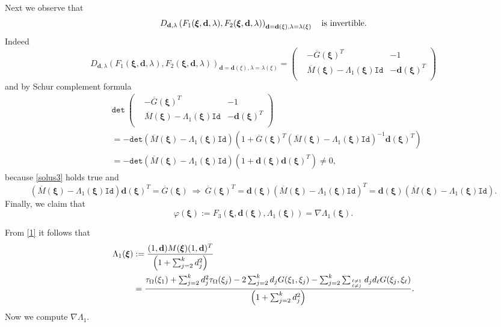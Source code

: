\documentclass[11pt,a4paper]{amsart}
\theoremstyle{definition}
\renewcommand{\(}{\left(}
\renewcommand{\)}{\right)}
\begin{document}
Next we observe that
\begin{equation}\label{solus2}
D_{ \mathbf{d},\lambda}\left(F_1(\boldsymbol\xi, \mathbf{d}, \lambda) , F_2(\boldsymbol\xi, \mathbf{d}, \lambda)\)_{ \mathbf{d}= \mathbf{d}(\xi),\lambda=\lambda(\xi)}\quad \hbox{is invertible.}
\end{equation}
Indeed
$$D_{ \mathbf{d},\lambda}\left(F_1(\boldsymbol\xi, \mathbf{d}, \lambda) , F_2(\boldsymbol\xi, \mathbf{d}, \lambda)\)_{ \mathbf{d}= \mathbf{d}(\xi),\lambda=\lambda(\xi)}=\(\begin{matrix}
&-\overline G(\boldsymbol\xi)^T &-1\\
&\overline M(\boldsymbol\xi)-\Lambda_1(\boldsymbol\xi) \mathtt {Id} &-\mathbf{d}(\boldsymbol\xi)^T\\
\end{matrix}\)$$
and by Schur complement formula
$$\begin{aligned}&\mathtt{det}\ \(\begin{matrix}
&-\overline G(\boldsymbol\xi)^T &-1\\
&\overline M(\boldsymbol\xi)-\Lambda_1(\boldsymbol\xi) \mathtt {Id} &-\mathbf{d}(\boldsymbol\xi)^T\\
\end{matrix}\)\\
&=-\mathtt{det}\(\overline M(\boldsymbol\xi)-\Lambda_1(\boldsymbol\xi) \mathtt {Id}\)\(1+\overline G(\boldsymbol\xi)^T\(\overline M(\boldsymbol\xi)-\Lambda_1(\boldsymbol\xi) \mathtt {Id}\)^{-1}\mathbf{d}(\boldsymbol\xi)^T\)\\
&=-\mathtt{det}\(\overline M(\boldsymbol\xi)-\Lambda_1(\boldsymbol\xi) \mathtt {Id}\)\(1+\mathbf{d}(\boldsymbol\xi)\mathbf{d}(\boldsymbol\xi)^T\)\not=0,\end{aligned}$$
because \eqref{solus3} holds true and 
$$ \left(\overline M(\boldsymbol\xi)-\Lambda_1(\boldsymbol\xi) \mathtt {Id}\right)\mathbf{d}(\boldsymbol\xi)^T=\overline G(\boldsymbol\xi)\ \Rightarrow\
 \overline G(\boldsymbol\xi)^T=\mathbf{d}(\boldsymbol\xi)\left(\overline M(\boldsymbol\xi)-\Lambda_1(\boldsymbol\xi) \mathtt {Id}\right)^T=\mathbf{d}(\boldsymbol\xi)\left(\overline M(\boldsymbol\xi)-\Lambda_1(\boldsymbol\xi) \mathtt {Id}\right).$$
Finally,  we claim that
\begin{equation}\label{var2}
\varphi(\boldsymbol\xi):=F_3(\boldsymbol\xi, \mathbf{d}(\boldsymbol\xi), \Lambda_1(\boldsymbol\xi))=\nabla \Lambda_1(\boldsymbol\xi).
\end{equation}

From \eqref{1} it follows that
$$\begin{aligned}\Lambda_1( \boldsymbol\xi)&:=\frac{(1,\mathbf{d}) M(\boldsymbol\xi)(1,\mathbf d)^T}{\left(1+\sum_{j=2}^k d_{j}^2\right)}\\
&=\frac{\tau_\Omega(\xi_1)+\sum_{j=2}^k d_{j}^2 \tau_\Omega(\xi_j) -2\sum_{j=2}^k d_{j} G(\xi_1, \xi_j)-\sum_{j=2}^k\sum_{\ell\neq 1\atop \ell \neq j}d_{j}d_{\ell} G(\xi_j, \xi_\ell)}{\left(1+\sum_{j=2}^k d_{j}^2\right)}.\end{aligned}$$
Now we compute $\nabla \Lambda_1 $.
\end{document}

